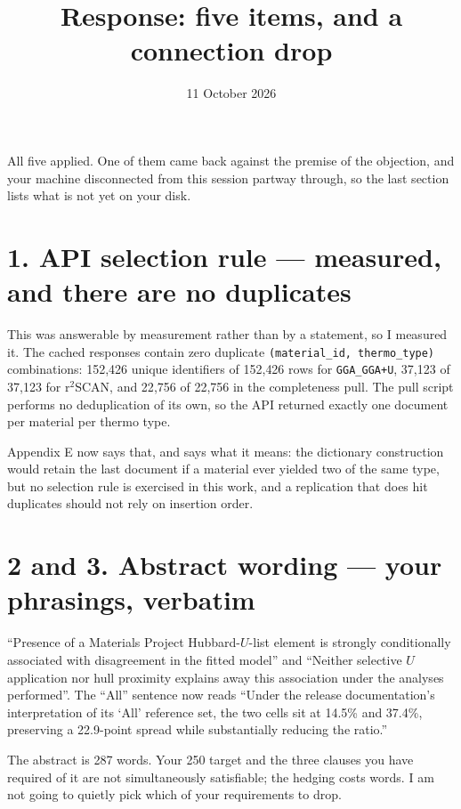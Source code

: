 \documentclass[11pt]{article}
\title{\textbf{Response: five items, and a connection drop}}
\author{}\date{11 October 2026}
\begin{document}
\maketitle\vspace{-3em}

All five applied. One of them came back against the premise of the objection, and your
machine disconnected from this session partway through, so the last section lists what is
not yet on your disk.

\section*{1. API selection rule --- measured, and there are no duplicates}

This was answerable by measurement rather than by a statement, so I measured it. The cached
responses contain zero duplicate \texttt{(material\_id, thermo\_type)} combinations:
152{,}426 unique identifiers of 152{,}426 rows for \texttt{GGA\_GGA+U}, 37{,}123 of
37{,}123 for r$^2$SCAN, and 22{,}756 of 22{,}756 in the completeness pull. The pull script
performs no deduplication of its own, so the API returned exactly one document per
material per thermo type.

Appendix E now says that, and says what it means: the dictionary construction would retain
the last document if a material ever yielded two of the same type, but no selection rule is
exercised in this work, and a replication that does hit duplicates should not rely on
insertion order.

\section*{2 and 3. Abstract wording --- your phrasings, verbatim}

``Presence of a Materials Project Hubbard-$U$-list element is strongly conditionally
associated with disagreement in the fitted model'' and ``Neither selective $U$ application
nor hull proximity explains away this association under the analyses performed''. The
``All'' sentence now reads ``Under the release documentation's interpretation of its `All'
reference set, the two cells sit at 14.5\% and 37.4\%, preserving a 22.9-point spread while
substantially reducing the ratio.''

The abstract is 287 words. Your 250 target and the three clauses you have required of it
are not simultaneously satisfiable; the hedging costs words. I am not going to quietly pick
which of your requirements to drop.
\end{document}
